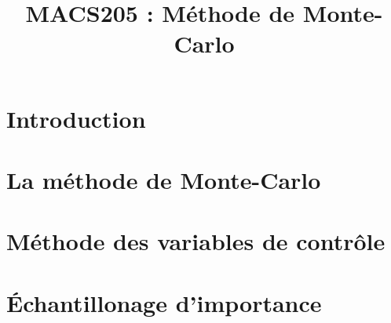 \documentclass[a4paper,9pt]{article}
\title{\vspace{-1.2cm} \textbf{MACS205 : Méthode de Monte-Carlo}}
\begin{document}
\maketitle

\vspace{-1.5cm}


\section{Introduction}
	

\section{La méthode de Monte-Carlo}
	

\section{Méthode des variables de contrôle}
	

\section{Échantillonage d'importance}
	
\end{document}
